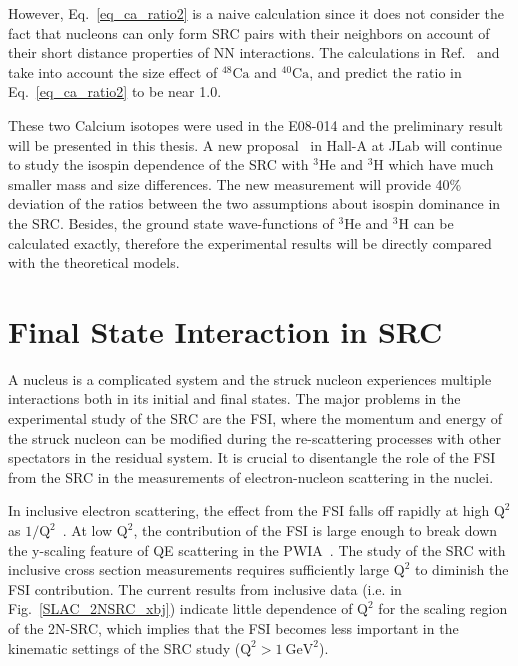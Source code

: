  However, Eq.~\eqref{eq_ca_ratio2} is a naive calculation since it does not consider the fact that nucleons can only form SRC pairs with their neighbors on account of their short distance properties of NN interactions. The calculations in Ref.~\cite{PhysRevC.84.031302} and \cite{PhysRevC.86.044619} take into account the size effect of $\mathrm{^{48}Ca}$ and $\mathrm{^{40}Ca}$, and predict the ratio in Eq.~\eqref{eq_ca_ratio2} to be near 1.0.
  
  These two Calcium isotopes were used in the E08-014 and the preliminary result will be presented in this thesis. A new proposal~\cite{E12_11_112_pr} in Hall-A at JLab will continue to study the isospin dependence of the SRC with $\mathrm{^{3}He}$ and $\mathrm{^{3}H}$ which have much smaller mass and size differences. The new measurement will provide 40\% deviation of the ratios between the two assumptions about isospin dominance in the SRC. Besides, the ground state wave-functions of $\mathrm{^{3}He}$ and $\mathrm{^{3}H}$ can be calculated exactly, therefore the experimental results will be directly compared with the theoretical models. 



\section{Final State Interaction in SRC}
A nucleus is a complicated system and the struck nucleon experiences multiple interactions both in its initial and final states. The major problems in the experimental study of the SRC are the FSI, where the momentum and energy of the struck nucleon can be modified during the re-scattering processes with other spectators in the residual system. It is crucial to disentangle the role of the FSI from the SRC in the measurements of electron-nucleon scattering in the nuclei.

 In inclusive electron scattering, the effect from the FSI falls off rapidly at high $\mathrm{Q^{2}}$ as $\mathrm{1/Q^{2}}$~\cite{day_arns,SLAC_Measurement_PRC.48.2451}. At low $\mathrm{Q^{2}}$, the contribution of the FSI is large enough to break down the y-scaling feature of QE scattering in the PWIA~\cite{Day:1987az}. The study of the SRC with inclusive cross section measurements requires sufficiently large $\mathrm{Q^{2}}$ to diminish the FSI contribution. The current results from inclusive data (i.e. in Fig.~\ref{SLAC_2NSRC_xbj}) indicate little dependence of $\mathrm{Q^{2}}$ for the scaling region of the 2N-SRC, which implies that the FSI becomes less important in the kinematic settings of the SRC study ($\mathrm{Q^{2}>1~GeV^{2}}$).

